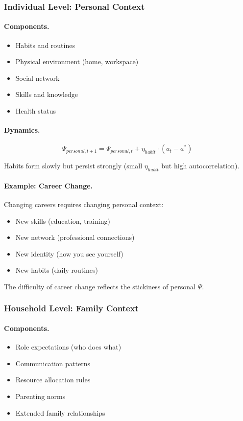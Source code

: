 \documentclass[12pt,a4paper]{article}
\begin{document}
\subsubsection{Individual Level: Personal Context}

\paragraph{Components.}
\begin{itemize}
  \item Habits and routines
  \item Physical environment (home, workspace)
  \item Social network
  \item Skills and knowledge
  \item Health status
\end{itemize}

\paragraph{Dynamics.}
\begin{equation}
  \Psi_{personal, t+1} = \Psi_{personal, t} + \eta_{habit} \cdot (a_t - a^*)
\end{equation}

Habits form slowly but persist strongly (small $\eta_{habit}$ but high autocorrelation).

\paragraph{Example: Career Change.}
Changing careers requires changing personal context:
\begin{itemize}
  \item New skills (education, training)
  \item New network (professional connections)
  \item New identity (how you see yourself)
  \item New habits (daily routines)
\end{itemize}

The difficulty of career change reflects the stickiness of personal $\Psi$.

\subsubsection{Household Level: Family Context}

\paragraph{Components.}
\begin{itemize}
  \item Role expectations (who does what)
  \item Communication patterns
  \item Resource allocation rules
  \item Parenting norms
  \item Extended family relationships
\end{itemize}
\end{document}
